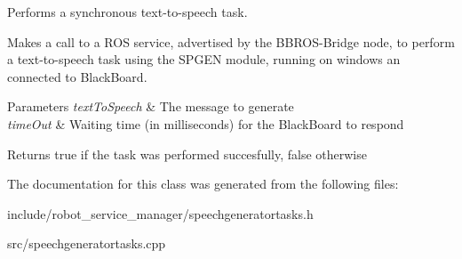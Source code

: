 Performs a synchronous text-\/to-\/speech task. 

Makes a call to a R\+OS service, advertised by the B\+B\+R\+O\+S-\/\+Bridge node, to perform a text-\/to-\/speech task using the S\+P\+G\+EN module, running on windows an connected to Black\+Board.


\begin{DoxyParams}{Parameters}
{\em text\+To\+Speech} & The message to generate \\
\hline
{\em time\+Out} & Waiting time (in milliseconds) for the Black\+Board to respond \\
\hline
\end{DoxyParams}
\begin{DoxyReturn}{Returns}
true if the task was performed succesfully, false otherwise 
\end{DoxyReturn}


The documentation for this class was generated from the following files\+:\begin{DoxyCompactItemize}
\item 
include/robot\+\_\+service\+\_\+manager/speechgeneratortasks.\+h\item 
src/speechgeneratortasks.\+cpp\end{DoxyCompactItemize}
